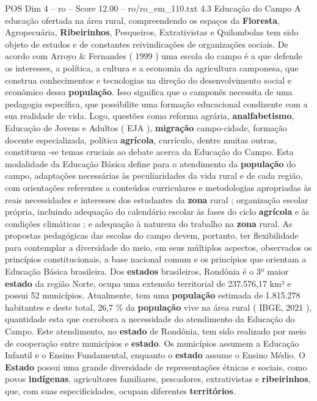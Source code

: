 \begin{textsample}{POS Dim 4 – ro – Score 12.00 – ro/ro\_em\_110.txt}  \label{ex:f4_pos_212}
4.3 Educação do Campo A educação ofertada na área rural, compreendendo os espaços da \textbf{Floresta}, Agropecuária, \textbf{Ribeirinhos}, Pesqueiros, Extrativistas e Quilombolas tem sido objeto de estudos e de constantes reivindicações de organizações sociais.
De acordo com Arroyo \& Fernandes ( 1999 ) uma escola do campo é a que defende os interesses, a política, a cultura e a economia da agricultura camponesa, que construa conhecimentos e tecnologias na direção do desenvolvimento social e econômico dessa \textbf{população}.
Isso significa que o camponês necessita de uma pedagogia específica, que possibilite uma formação educacional condizente com a sua realidade de vida.
Logo, questões como reforma agrária, \textbf{analfabetismo}, Educação de Jovens e Adultos ( EJA ), \textbf{migração} campo-cidade, formação docente especializada, política \textbf{agrícola}, currículo, dentre muitas outras, constituem -se temas cruciais ao debate acerca da Educação do Campo.
Esta modalidade da Educação Básica define para o atendimento da \textbf{população} do campo, adaptações necessárias às peculiaridades da vida rural e de cada região, com orientações referentes a conteúdos curriculares e metodologias apropriadas às reais necessidades e interesses dos estudantes da \textbf{zona} rural ; organização escolar própria, incluindo adequação do calendário escolar às fases do ciclo \textbf{agrícola} e às condições climáticas ; e adequação à natureza do trabalho na \textbf{zona} rural.
As propostas pedagógicas das escolas do campo devem, portanto, ter flexibilidade para contemplar a diversidade do meio, em seus múltiplos aspectos, observados os princípios constitucionais, a base nacional comum e os princípios que orientam a Educação Básica brasileira.
Dos \textbf{estados} brasileiros, Rondônia é o 3º maior \textbf{estado} da região Norte, ocupa uma extensão territorial de 237.576,17 km² e possui 52 municípios.
Atualmente, tem uma \textbf{população} estimada de 1.815.278 habitantes e deste total, 26,7 \% da \textbf{população} vive na área rural ( IBGE, 2021 ), quantidade esta que corrobora a necessidade do atendimento da Educação do Campo.
Este atendimento, no \textbf{estado} de Rondônia, tem sido realizado por meio de cooperação entre municípios e \textbf{estado}.
Os municípios assumem a Educação Infantil e o Ensino Fundamental, enquanto o \textbf{estado} assume o Ensino Médio.
O \textbf{Estado} possui uma grande diversidade de representações étnicas e sociais, como povos \textbf{indígenas}, agricultores familiares, pescadores, extrativistas e \textbf{ribeirinhos}, que, com suas especificidades, ocupam diferentes \textbf{territórios}.

\end{textsample}
